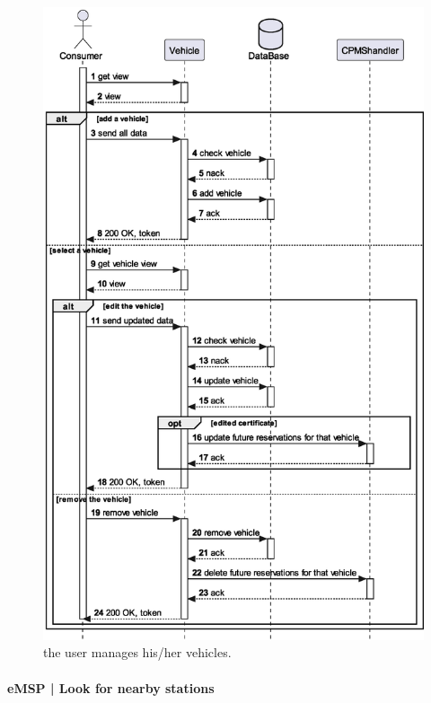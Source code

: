 \begin{figure}[h!]
    \centering
    \includegraphics[width=0.59\columnwidth]{./images/diagrams/sequences/emsp/vehicles}
    \caption{the user manages his/her vehicles.}
\end{figure}

\pagebreak

\paragraph{eMSP | Look for nearby stations}

